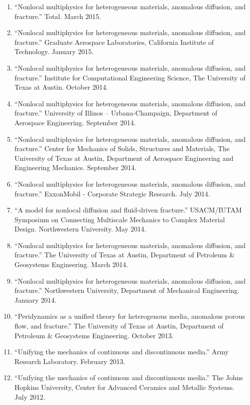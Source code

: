 \begin{etaremune}
\begin{enumerate}
    \item ``Nonlocal multiphysics for heterogeneous materials, anomalous diffusion, and fracture.'' Total. March 2015.
    \item ``Nonlocal multiphysics for heterogeneous materials, anomalous diffusion, and fracture.'' Graduate Aerospace Laboratories, California Institute of Technology. January 2015.
    \item ``Nonlocal multiphysics for heterogeneous materials, anomalous diffusion, and fracture.'' Institute for Computational Engineering Science, The University of Texas at Austin. October 2014.
    \item ``Nonlocal multiphysics for heterogeneous materials, anomalous diffusion, and fracture.'' University of Illinos -- Urbana-Champaign, Department of Aerospace Engineering. September 2014.
    \item ``Nonlocal multiphysics for heterogeneous materials, anomalous diffusion, and fracture.'' Center for Mechanics of Solids, Structures and Materials, The University of Texas at Austin, Department of Aerospace Engineering and Engineering Mechanics. September 2014.
    \item ``Nonlocal multiphysics for heterogeneous materials, anomalous diffusion, and fracture.'' ExxonMobil - Corporate Strategic Research. July 2014.
    \item ``A model for nonlocal diffusion and fluid-driven fracture.'' USACM/IUTAM Symposium on Connecting Multiscale Mechanics to Complex Material Design. Northwestern University. May 2014.
    \item ``Nonlocal multiphysics for heterogeneous materials, anomalous diffusion, and fracture.'' The University of Texas at Austin, Department of Petroleum \& Geosystems Engineering. March 2014.
    \item ``Nonlocal multiphysics for heterogeneous materials, anomalous diffusion, and fracture.'' Northwestern University, Department of Mechanical Engineering. January 2014.
    \item ``Peridynamics as a unified theory for heterogenous media, anomalous porous flow, and fracture.'' The University of Texas at Austin, Department of Petroleum \& Geosystems Engineering. October 2013.
    \item ``Unifying the mechanics of continuous and discontinuous media.''  Army Research Laboratory.  February 2013.
    \item ``Unifying the mechanics of continuous and discontinuous media.''  The Johns Hopkins University, Center for Advanced Ceramics and Metallic Systems.  July 2012.

\end{enumerate}
\end{etaremune}

